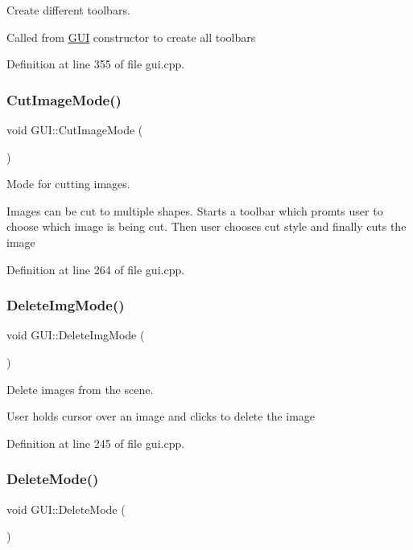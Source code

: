 Create different toolbars. 

Called from \mbox{\hyperlink{classGUI}{G\+UI}} constructor to create all toolbars 

Definition at line 355 of file gui.\+cpp.

\mbox{\label{classGUI_ae8acfcce2ea4da241c920076b72f1c93}} 
\subsubsection{\texorpdfstring{Cut\+Image\+Mode()}{CutImageMode()}}
{\footnotesize\ttfamily void G\+U\+I\+::\+Cut\+Image\+Mode (\begin{DoxyParamCaption}{ }\end{DoxyParamCaption})}



Mode for cutting images. 

Images can be cut to multiple shapes. Starts a toolbar which promts user to choose which image is being cut. Then user chooses cut style and finally cuts the image 

Definition at line 264 of file gui.\+cpp.

\mbox{\label{classGUI_a453b758a292b4a0e6f52f25b1bb2de77}} 
\subsubsection{\texorpdfstring{Delete\+Img\+Mode()}{DeleteImgMode()}}
{\footnotesize\ttfamily void G\+U\+I\+::\+Delete\+Img\+Mode (\begin{DoxyParamCaption}{ }\end{DoxyParamCaption})}



Delete images from the scene. 

User holds cursor over an image and clicks to delete the image 

Definition at line 245 of file gui.\+cpp.

\mbox{\label{classGUI_aac66154aaa763aac4d20e55cbd1bdc0d}} 
\subsubsection{\texorpdfstring{Delete\+Mode()}{DeleteMode()}}
{\footnotesize\ttfamily void G\+U\+I\+::\+Delete\+Mode (\begin{DoxyParamCaption}{ }\end{DoxyParamCaption})}



